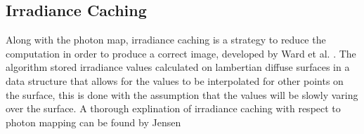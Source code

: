 \subsection{Irradiance Caching}
Along with the photon map, irradiance caching is a strategy to reduce the computation in order to
produce a correct image, developed by Ward et al. \cite{Ward88}. The algorithm stored irradiance
values calculated on lambertian diffuse surfaces in a data structure that allows for the values
to be interpolated for other points on the surface, this is done with the assumption that the
values will be slowly varing over the surface. A thorough explination of irradiance caching with
respect to photon mapping can be found by Jensen \cite{JensenBook}
